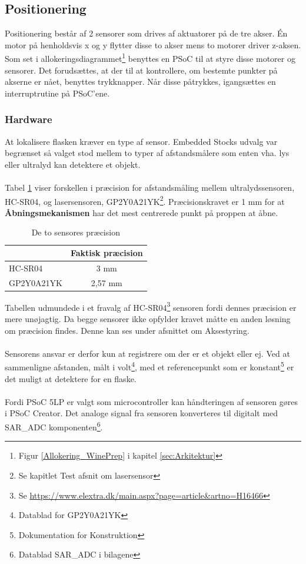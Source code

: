 \subsection{Positionering}
\label{sub:Pos}
Positionering består af 2 sensorer som drives af aktuatorer på de tre akser. Én motor på henholdsvis x og y flytter disse to akser mens to motorer driver z-aksen. \\
Som set i allokeringsdiagrammet\footnote{Figur \ref{Allokering_WinePrep} i kapitel \ref{sec:Arkitektur}} benyttes en PSoC til at styre disse motorer og sensorer. Det forudsættes, at der til at kontrollere, om bestemte punkter på akserne er nået, benyttes trykknapper. Når disse påtrykkes, igangsættes en interruptrutine på PSoC'ene.

\subsubsection{Hardware}
\label{pos_hw}
At lokalisere flasken kræver en type af sensor. Embedded Stocks udvalg var begrænset så valget stod mellem to typer af afstandsmålere som enten vha. lys eller ultralyd kan detektere et objekt.
\\
\\
Tabel \ref{tab:Sensor_precision} viser forskellen i præcision for afstandsmåling mellem ultralydssensoren, HC-SR04, og  lasersensoren, GP2Y0A21YK\footnote{Se kapitlet Test afsnit om lasersensor}. Præcisionskravet er 1 mm for at \textbf{Åbningsmekanismen} har det mest centrerede punkt på proppen at åbne.

\begin{table}[H]
	\centering
	\begin{tabular}{ |l|c| }
  		\hline
   		& Faktisk præcision \\
  		\hline 
  		HC-SR04 & 3 mm \\
  		\hline
  		GP2Y0A21YK  & 2,57 mm \\
  		\hline
	\end{tabular}
	\caption{De to sensores præcision}
	\label{tab:Sensor_precision}
\end{table}

\noindent
Tabellen udmundede i et fravalg af HC-SR04\footnote{Se \url{https://www.elextra.dk/main.aspx?page=article&artno=H16466}} sensoren fordi dennes præcision er mere unøjagtig. Da begge sensorer ikke opfylder kravet måtte en anden løsning om præcision findes. Denne kan ses under afsnittet om Aksestyring.
\\
\\
Sensorens ansvar er derfor kun at registrere om der er et objekt eller ej. Ved at sammenligne afstanden, målt i volt\footnote{Datablad for GP2Y0A21YK}, med et referencepunkt som er konstant\footnote{Dokumentation for Konstruktion} er det muligt at detektere for en flaske.
\\
\\
Fordi PSoC 5LP er valgt som microcontroller kan håndteringen af sensoren gøres i PSoC Creator. Det analoge signal fra sensoren konverteres til digitalt med SAR\_ADC komponenten\footnote{Datablad SAR\_ADC i bilagene}.

